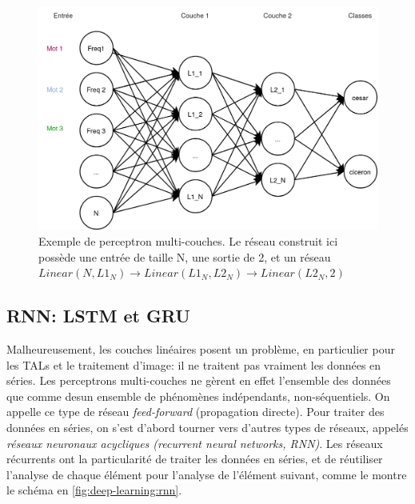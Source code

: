 \begin{figure}
    \centering
    \includegraphics[width=\linewidth]{results/deep-learning/explanations/MLP.png}
    \caption{Exemple de perceptron multi-couches. Le réseau construit ici possède une entrée de taille N, une sortie de 2, et un réseau $Linear(N, L1_N) \rightarrow Linear(L1_N, L2_N) \rightarrow Linear(L2_N, 2)$}
    \label{fig:deep-learning:mlp}
\end{figure}

\subsection{RNN: LSTM et GRU}

Malheureusement, les couches linéaires posent un problème, en particulier pour les TALs et le traitement d'image: il ne traitent pas vraiment les données en séries. Les perceptrons multi-couches ne gèrent en effet l'ensemble des données que comme desun ensemble de phénomènes indépendants, non-séquentiels. On appelle ce type de réseau \textit{feed-forward} (propagation directe). Pour traiter des données en séries, on s'est d'abord tourner vers d'autres types de réseaux, appelés \textit{réseaux neuronaux acycliques (recurrent neural networks, RNN)}. Les réseaux récurrents ont la particularité de traiter les données en séries, et de réutiliser l'analyse de chaque élément pour l'analyse de l'élément suivant, comme le montre le schéma en \ref{fig:deep-learning:rnn}.

